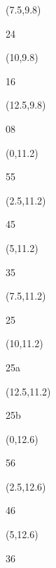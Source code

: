 \documentclass[a4paper]{article}
\newcommand{\myseat}[4]{%
\vspace{-0.1cm}
\parbox[t][2.2cm][t]{3.5cm}{
\small #1 %
\begin{description}
\vspace{-0.1cm}
\item [ID:] #2
\vspace{-0.1cm}
\item [Team:] #3 \normalsize
\vspace{-0.1cm}
\item \normalsize #4
\vspace{-0.1cm}
\end{description}
}
}
\begin{document}
\begin{CJK}{UTF8}{cyberbit}
\begin{textblock}{2.5}(7.5,9.8)
\textblockcolor{}
\myseat{24}{}{}{}
\end{textblock}

\begin{textblock}{2.5}(10,9.8)
\textblockcolor{}
\myseat{16}{}{}{}
\end{textblock}

\begin{textblock}{2.5}(12.5,9.8)
\textblockcolor{}
\myseat{08}{}{}{}
\end{textblock}

\begin{textblock}{2.5}(0,11.2)
\textblockcolor{}
\myseat{55}{}{}{}
\end{textblock}

\begin{textblock}{2.5}(2.5,11.2)
\textblockcolor{}
\myseat{45}{}{}{}
\end{textblock}

\begin{textblock}{2.5}(5,11.2)
\textblockcolor{}
\myseat{35}{}{}{}
\end{textblock}

\begin{textblock}{2.5}(7.5,11.2)
\textblockcolor{}
\myseat{25}{}{}{}
\end{textblock}

\begin{textblock}{2.5}(10,11.2)
\textblockcolor{}
\myseat{25a}{}{}{}
\end{textblock}

\begin{textblock}{2.5}(12.5,11.2)
\textblockcolor{}
\myseat{25b}{}{}{}
\end{textblock}

\begin{textblock}{2.5}(0,12.6)
\textblockcolor{}
\myseat{56}{}{}{}
\end{textblock}

\begin{textblock}{2.5}(2.5,12.6)
\textblockcolor{}
\myseat{46}{}{}{}
\end{textblock}

\begin{textblock}{2.5}(5,12.6)
\textblockcolor{}
\myseat{36}{}{}{}
\end{textblock}


\end{CJK}
\end{document}
